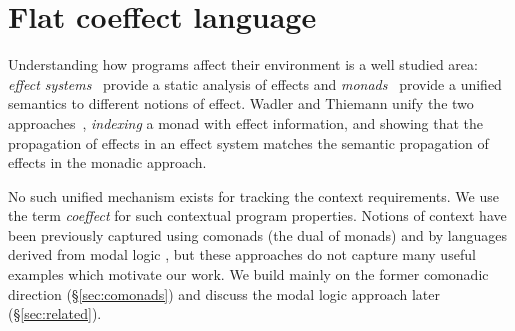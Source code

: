 \chapter{Flat coeffect language} 
\label{ch:flat-coeffects} 


\newcommand{\iunit}{\mathsf{e}}
\newcommand{\imult}{\oplus}
\newcommand{\iftor}[1]{C^{#1}}
\newcommand{\iftorhat}[1]{\hat{C}^{#1}}

\newcommand{\cosem}[1]{\llbracket #1 \rrbracket}
\newcommand{\interp}[1]{\llbracket #1 \rrbracket}
\newcommand{\ccat}[0]{\mathcal{C}}
\newcommand{\obj}[1]{\textnormal{obj}(#1)}

\newcommand{\cobind}[2]{#1^\dagger_{#2}}
\newcommand{\cmerge}[0]{ \ident{m} }
\newcommand{\csplit}[0]{ \ident{n} }
\newcommand{\counit}[0]{ \varepsilon }





Understanding how programs affect their environment is a well studied area: \emph{effect 
systems}~\cite{effects-talpin-et-al} provide a static analysis of effects and 
\emph{monads}~\cite{monad-notions} provide a unified semantics to different notions of effect.  
Wadler and Thiemann unify the two approaches~\cite{monads-effects-marriage}, \emph{indexing}
a monad with effect information, and showing that the propagation of effects in an effect system 
matches the semantic propagation of effects in the monadic approach.

No such unified mechanism exists for tracking the context requirements. We use the term 
\emph{coeffect} for such contextual program properties. 
Notions of context have been previously captured using comonads
\cite{comonads-notions} (the dual of monads) 
and by languages derived from modal logic
\cite{logic-modal-reconstruction,logic-cmtt}, but these approaches
do not capture many useful examples which motivate our work. 
We build mainly on the former comonadic direction (\S\ref{sec:comonads}) and discuss the
modal logic approach later (\S\ref{sec:related}).

